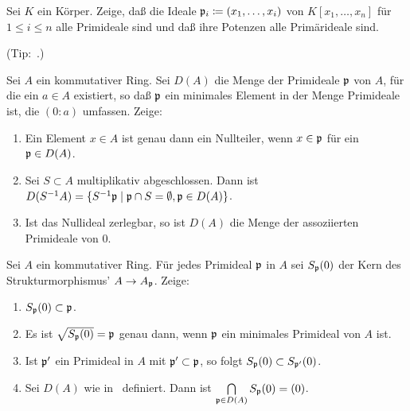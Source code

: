 \begin{exercise}
	Sei \(K\) ein Körper. Zeige, daß die Ideale \(\mathfrak{p}_i \coloneqq
	(x_1, \dotsc, x_i)\) von \(K[x_1,\ldots,x_n]\) für \(1 \leq i \leq n\) alle Primideale sind und
	daß ihre Potenzen alle Primärideale sind.
	
	(Tip:~.)
\end{exercise}

\begin{exercise}
	\label{exer:assoc_primes_to_zero}
	Sei \(A\) ein kommutativer Ring. Sei \(D(A)\) die Menge der Primideale
	\(\mathfrak{p}\) von \(A\), für die ein \(a \in A\) existiert, so daß
	\(\mathfrak{p}\) ein minimales Element in der Menge Primideale ist, die
	\((0 : a)\) umfassen. Zeige:
	\begin{enumerate}
	\item
		Ein Element \(x \in A\) ist genau dann ein Nullteiler,
		wenn \(x \in \mathfrak{p}\) für ein \(\mathfrak{p} \in D(A)\).
	\item
		Sei \(S \subset A\) multiplikativ abgeschlossen. Dann ist
		\(D(S^{-1} A) = \{S^{-1} \mathfrak{p} \mid \mathfrak{p} \cap S = \emptyset,
			\mathfrak{p} \in D(A)\}\).
	\item
		Ist das Nullideal zerlegbar, so ist \(D(A)\) die Menge der assoziierten
		Primideale von \(0\).
	\end{enumerate}
\end{exercise}

\begin{exercise}
	\label{exer:zero_germ}
	Sei \(A\) ein kommutativer Ring. Für jedes Primideal \(\mathfrak{p}\) in \(A\)
	sei \(S_{\mathfrak{p}}(0)\) der Kern des Strukturmorphismus' \(A \to A_{\mathfrak{p}}\).
	Zeige:
	\begin{enumerate}
	\item
		\(S_{\mathfrak{p}}(0) \subset \mathfrak{p}\).
	\item
		Es ist \(\sqrt{S_{\mathfrak{p}}(0)} = \mathfrak{p}\) genau dann, wenn
		\(\mathfrak{p}\) ein minimales Primideal von \(A\) ist.
	\item
		Ist \(\mathfrak{p}'\) ein Primideal in \(A\) mit \(\mathfrak{p}' \subset
		\mathfrak{p}\), so folgt \(S_{\mathfrak{p}}(0) \subset S_{\mathfrak{p}'}(0)\).
	\item
		Sei \(D(A)\) wie in~ definiert.
		Dann ist \(\bigcap\limits_{\mathfrak{p} \in D(A)} S_{\mathfrak{p}}(0) = (0)\).
	\end{enumerate}
\end{exercise}

